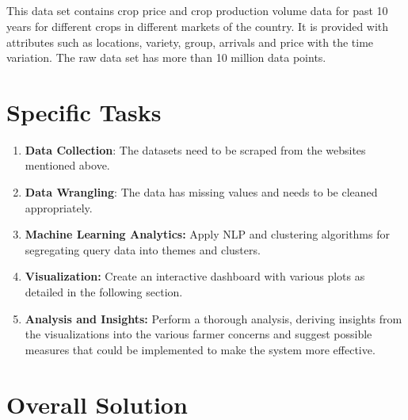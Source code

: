 \documentclass[11pt]{article}
\begin{document}

\subsection*{}

This data set contains crop price and crop production volume data for past 10 years for different crops in different markets of the country. It is provided with attributes such as locations, variety, group, arrivals and price with the time variation. The raw data set has more than 10 million data points.



\section{Specific Tasks}

\begin{enumerate}
    \item \textbf{Data Collection}: The datasets need to be scraped from the websites mentioned above.
    \item \textbf{Data Wrangling}: The data has missing values and needs to be cleaned appropriately.
    \item \textbf{Machine Learning Analytics:} Apply NLP and clustering algorithms for segregating query data into themes and clusters.
    \item \textbf{Visualization:} Create an interactive dashboard with various plots as detailed in the following section.
    \item \textbf{Analysis and Insights:} Perform a thorough analysis, deriving insights from the visualizations into the various farmer concerns and suggest possible measures that could be implemented to make the system more effective.
    
\end{enumerate}

\section{Overall Solution}
\end{document}

